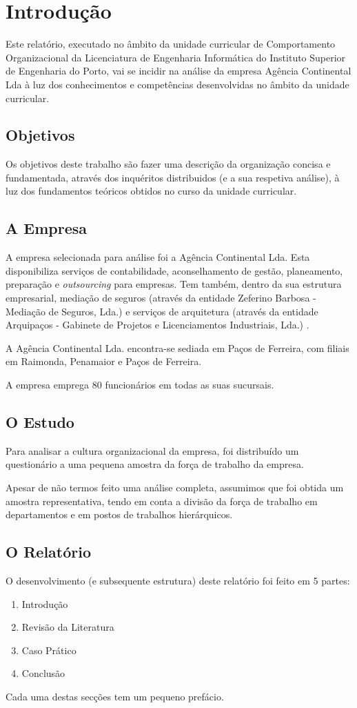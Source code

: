 
\section{Introdução}

Este relatório, executado no âmbito da unidade curricular de Comportamento Organizacional da Licenciatura de Engenharia Informática do Instituto Superior de Engenharia do Porto, vai se incidir na análise da empresa Agência Continental Lda à luz dos conhecimentos e competências desenvolvidas no âmbito da unidade curricular.

\subsection{Objetivos}

Os objetivos deste trabalho são fazer uma descrição da organização concisa e fundamentada, através dos inquéritos distribuidos (e a sua respetiva análise), à luz dos fundamentos teóricos obtidos no curso da unidade curricular.

\subsection{A Empresa}
A empresa selecionada para análise foi a Agência Continental Lda. Esta disponibiliza serviços de contabilidade, aconselhamento de gestão, planeamento, preparação e \textit{outsourcing} para empresas. Tem também, dentro da sua estrutura empresarial, mediação de seguros (através da entidade Zeferino Barbosa - Mediação de Seguros, Lda.) e serviços de arquitetura (através da entidade Arquipaços - Gabinete de Projetos e Licenciamentos Industriais, Lda.) \parencite{agenciacontinental}.

A Agência Continental Lda. encontra-se sediada em Paços de Ferreira, com filiais em Raimonda, Penamaior e Paços de Ferreira.

A empresa emprega 80 funcionários em todas as suas sucursais.

\subsection{O Estudo}

Para analisar a cultura organizacional da empresa, foi distribuído um questionário a uma pequena amostra da força de trabalho da empresa.

Apesar de não termos feito uma análise completa, assumimos que foi obtida um amostra representativa, tendo em conta a divisão da força de trabalho em departamentos e em postos de trabalhos hierárquicos.

\subsection{O Relatório}

O desenvolvimento (e subsequente estrutura) deste relatório foi feito em 5 partes:

\begin{enumerate}
	\item Introdução
	\item Revisão da Literatura
	\item Caso Prático
	\item Conclusão
\end{enumerate}

Cada uma destas secções tem um pequeno prefácio.